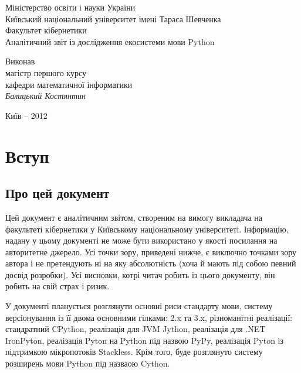 \documentclass[a4paper, 12pt, onsedie]{article}
\begin{document}
\begin{titlepage}
    \begin{center}
        \normalsize{
            Міністерство освіти і науки України\\
            Київський національний університет імені Тараса Шевченка\\
            Факультет кібернетики\\[4.0cm]
        }
        \Huge{Аналітичний звіт із дослідження екосистеми мови Python}\\[9.0cm]
        \large{
            \begin{flushright}
                \parbox[position=right]{230px}{
                    Виконав\\
                    магістр першого курсу\\
                    кафедри математичної інформатики\\
                    \textit{Балицький Костянтин}
                }
            \end{flushright}
        }

        \vfill{\normalsize{Київ -- 2012}}
    \end{center}
\end{titlepage}

\tableofcontents
\pagebreak

\section{Вступ}

\subsection{Про цей документ}

Цей документ є аналітичним звітом, створеним на вимогу викладача на факультеті кібернетики у Київському
національному університеті. Інформацію, надану у цьому документі не може бути використано у якості посилання на
авторитетне джерело. Усі точки зору, приведені нижче, є виключно точками зору автора і не претендують ні на яку
абсолютність (хоча й мають під собою певний досвід розробки). Усі висновки, котрі читач робить із цього
документу, він робить на свій страх і ризик.

У документі планується розглянути основні риси стандарту мови, систему версіонування із її двома основними
гілками: 2.x та 3.x, різноманітні реалізації: стандратний CPython, реалізація для JVM Jython, реалізація для 
.NET IronPyton, реалізація Pyton на Python під назвою PyPy, реалізація Pyton із підтримкою мікропотоків Stackless. 
Крім того, буде розглянуто систему розширень мови Python під назваою Cython.
\end{document}
